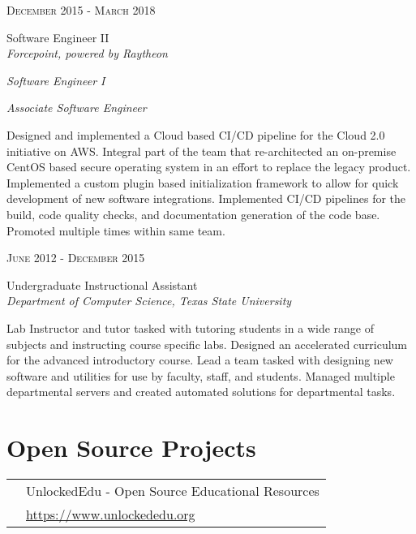 \documentclass[10pt]{article} %
\begin{document}
\begin{minipage}[t]{0.5\textwidth}
{\raggedleft\textsc{December 2015 - March 2018}\par}

{
\raggedright\large Software Engineer II\\
\textit{Forcepoint, powered by Raytheon}\\
\raggedright\small \textit{Software Engineer I}\\
\raggedright\small \textit{Associate Software Engineer}\\
}

\normalsize{Designed and implemented a Cloud based CI/CD pipeline for the Cloud 2.0 initiative on AWS. Integral part of the team that re-architected an on-premise CentOS based secure operating system in an effort to replace the legacy product. Implemented a custom plugin based initialization framework to allow for quick development of new software integrations. Implemented CI/CD pipelines for the build, code quality checks, and documentation generation of the code base. Promoted multiple times within same team.}\\



{\raggedleft\textsc{June 2012 - December 2015}\par}

{\raggedright\large Undergraduate Instructional Assistant\\
\textit{Department of Computer Science, Texas State University}\\[5pt]}

\normalsize{Lab Instructor and tutor tasked with tutoring students in a wide range of subjects and instructing course specific labs. Designed an accelerated curriculum for the advanced introductory course. Lead a team tasked with designing new software and utilities for use by faculty, staff, and students. Managed multiple departmental servers and created automated solutions for departmental tasks.}\\

\section{Open Source Projects}

\begin{tabular}{rl}
& UnlockedEdu - Open Source Educational Resources\\
& \quad \href{https://www.unlockededu.org}{https://www.unlockededu.org} \\
\end{tabular}\\[10pt]





\end{minipage} %
\end{document}

